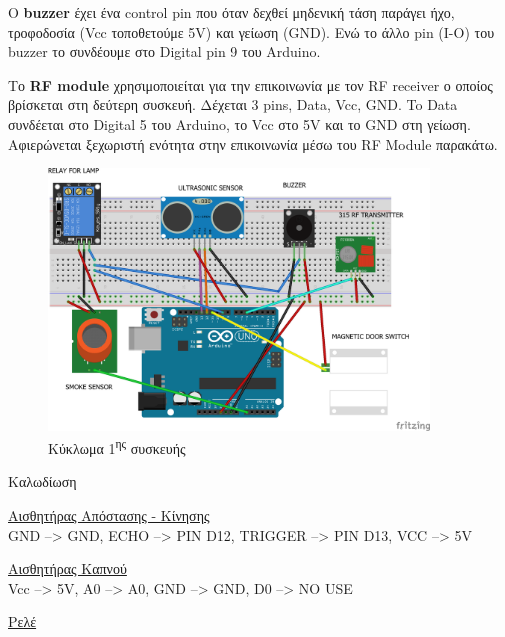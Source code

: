 \documentclass[twoside,a4paper]{article}
\newcommand\tab[1][1cm]{\hspace*{#1}}
\begin{document}
\begin{flushleft}
\par 
O \textbf{buzzer} έχει ένα control pin που όταν δεχθεί μηδενική τάση παράγει ήχο, τροφοδοσία (Vcc τοποθετούμε 5V) και γείωση (GND). Ενώ το άλλο pin (I-O) του buzzer το συνδέουμε στο Digital pin 9 του Arduino. 
\par 
Το \textbf{RF module} χρησιμοποιείται για την επικοινωνία με τον RF receiver ο οποίος βρίσκεται στη δεύτερη συσκευή. Δέχεται 3 pins, Data, Vcc, GND. To Data συνδέεται στο Digital 5 του Arduino, το Vcc στο 5V και το GND στη γείωση. Αφιερώνεται ξεχωριστή ενότητα στην επικοινωνία μέσω του RF Module παρακάτω.
 \end{flushleft}
 \newpage 
\vspace{5mm}
 \begin{figure}[h]
 \includegraphics[width=0.9\textwidth,right]{dev1}
 \caption{ Κύκλωμα 1\textsuperscript{ης} συσκευής}
 \end{figure}
\vspace{4mm}
 {\large\center Καλωδίωση\\}
  \vspace{6mm}
 \par\textendash\hspace{0.5mm} \underline{Αισθητήρας Απόστασης - Κίνησης} \\
 
 \tab\hspace{1.5mm} GND --> GND, ECHO --> PIN D12, TRIGGER --> PIN D13, VCC --> 5V \\
 
 \par\textendash\hspace{0.5mm} \underline{Αισθητήρας Καπνού} \\
  
 \tab\hspace{1.5mm} Vcc --> 5V, Α0 --> Α0, GND --> GND, D0 --> NO USE\\
 \par\textendash\hspace{0.5mm} \underline{ Ρελέ} \\
 
\end{document}
